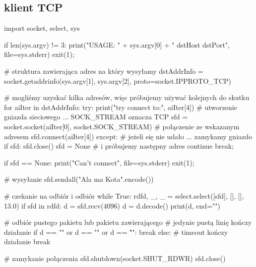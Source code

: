 \subsection{klient TCP}
\begin{CodeFrame*}[python]{}
import socket, select, sys

if len(sys.argv) != 3:
	print("USAGE: " + sys.argv[0] + " dstHost dstPort", file=sys.stderr)
	exit(1);

# struktura zawierająca adres na który wysyłamy
dstAddrInfo = socket.getaddrinfo(sys.argv[1], sys.argv[2], proto=socket.IPPROTO_TCP)

# mogliśmy uzyskać kilka adresów, więc próbujemy używać kolejnych do skutku
for aiIter in dstAddrInfo:
	try:
		print("try connect to:", aiIter[4])
		# utworzenie gniazda sieciowego ... SOCK_STREAM oznacza TCP
		sfd = socket.socket(aiIter[0], socket.SOCK_STREAM)
		# połączenie ze wskazanym adresem
		sfd.connect(aiIter[4])
	except:
		# jeżeli się nie udało ... zamykamy gniazdo
		if sfd:
			sfd.close()
		sfd = None
		# i próbujemy następny adres
		continue
	break;

if sfd == None:
	print("Can't connect", file=sys.stderr)
	exit(1);

# wysyłanie
sfd.sendall("Ala ma Kota\n".encode())

# czekanie na odbiór i odbiór
while True:
	rdfd, _, _ = select.select([sfd], [], [], 13.0)
	if sfd in rdfd:
		d = sfd.recv(4096)
		d = d.decode()
		print(d, end="")
		
		# odbiór pustego pakietu lub pakietu zawierającego
		# jedynie pustą linię kończy działanie
		if d == "" or d == "\n" or d == "\r\n":
			break
	else:
		# timeout kończy działanie
		break

# zamykanie połączenia
sfd.shutdown(socket.SHUT_RDWR)
sfd.close()
\end{CodeFrame*}

